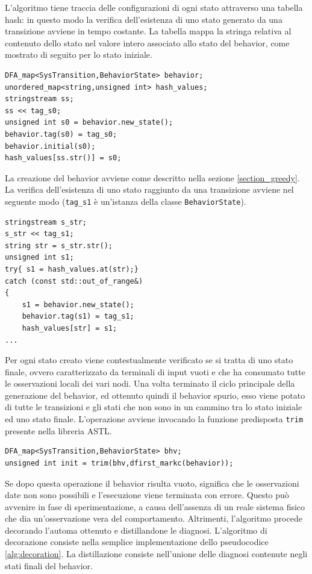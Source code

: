 L'algoritmo tiene traccia delle configurazioni di ogni stato attraverso una tabella hash: in questo modo la verifica dell'esistenza di uno stato generato da una transizione avviene in tempo costante. La tabella mappa la stringa relativa al contenuto dello stato nel valore intero associato allo stato del behavior, come mostrato di seguito per lo stato iniziale.

\begin{verbatim}
DFA_map<SysTransition,BehaviorState> behavior;
unordered_map<string,unsigned int> hash_values;
stringstream ss;
ss << tag_s0;
unsigned int s0 = behavior.new_state();
behavior.tag(s0) = tag_s0;
behavior.initial(s0);
hash_values[ss.str()] = s0;
\end{verbatim}

La creazione del behavior avviene come descritto nella sezione \ref{section_greedy}.
La verifica dell'esistenza di uno stato raggiunto da una transizione avviene nel seguente modo (\verb|tag_s1| è un'istanza della classe \verb|BehaviorState|).

\begin{verbatim}
stringstream s_str;
s_str << tag_s1;
string str = s_str.str();
unsigned int s1;
try{ s1 = hash_values.at(str);}
catch (const std::out_of_range&)
{
    s1 = behavior.new_state();
    behavior.tag(s1) = tag_s1;
    hash_values[str] = s1;
...
\end{verbatim}

Per ogni stato creato viene contestualmente verificato se si tratta di uno stato finale, ovvero caratterizzato da terminali di input vuoti e che ha consumato tutte le osservazioni locali dei vari nodi.
Una volta terminato il ciclo principale della generazione del behavior, ed ottenuto quindi il behavior spurio, esso viene potato di tutte le transizioni e gli stati che non sono in un cammino tra lo stato iniziale ed uno stato finale. L'operazione avviene invocando la funzione predisposta \verb|trim| presente nella libreria ASTL.

\begin{verbatim}
DFA_map<SysTransition,BehaviorState> bhv;
unsigned int init = trim(bhv,dfirst_markc(behavior));
\end{verbatim}

Se dopo questa operazione il behavior risulta vuoto, significa che le osservazioni date non sono possibili e l'esecuzione viene terminata con errore. Questo può avvenire in fase di sperimentazione, a causa dell'assenza di un reale sistema fisico che dia un'osservazione vera del comportamento.
Altrimenti, l'algoritmo procede decorando l'automa ottenuto e distillandone le diagnosi.
L'algoritmo di decorazione consiste nella semplice implementazione dello pseudocodice \ref{alg:decoration}. La distillazione consiste nell'unione delle diagnosi contenute negli stati finali del behavior.

